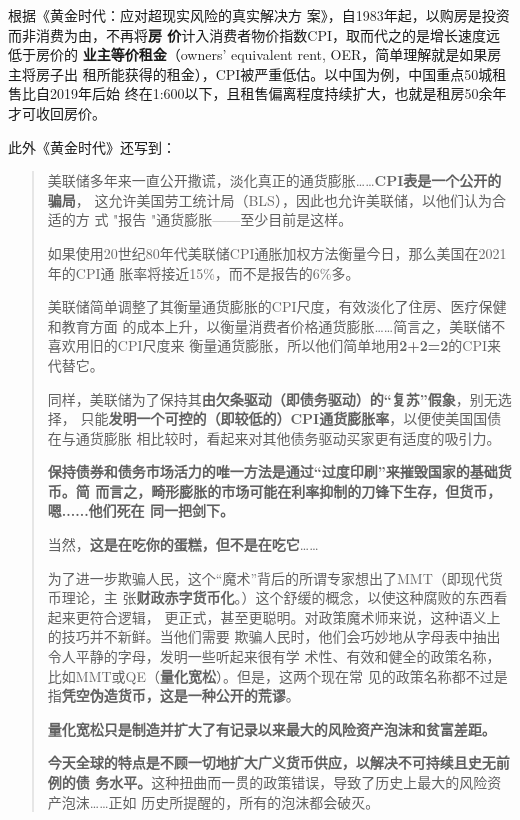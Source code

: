 根据《黄金时代：应对超现实风险的真实解决方
案》\cite{piepenburg2022gold}，自1983年起，以购房是投资而非消费为由，不再将\textbf{房
  价}计入消费者物价指数CPI，取而代之的是增长速度远低于房价的%
\textbf{业主等价租金}（owners’ equivalent rent, OER，简单理解就是如果房主将房子出
租所能获得的租金），CPI被严重低估。以中国为例，中国重点50城租售比自2019年后始
终在1:600以下，且租售偏离程度持续扩大，也就是租房50余年才可收回房价。


此外《黄金时代》还写到：
\begin{quotation}
  美联储多年来一直公开撒谎，淡化真正的通货膨胀……\textbf{CPI表是一个公开的骗局}，
  这允许美国劳工统计局（BLS），因此也允许美联储，以他们认为合适的方
  式 "报告 "通货膨胀——至少目前是这样。

  如果使用20世纪80年代美联储CPI通胀加权方法衡量今日，那么美国在2021年的CPI通
  胀率将接近15\%，而不是报告的6\%多。

  美联储简单调整了其衡量通货膨胀的CPI尺度，有效淡化了住房、医疗保健和教育方面
  的成本上升，以衡量消费者价格通货膨胀……简言之，美联储不喜欢用旧的CPI尺度来
  衡量通货膨胀，所以他们简单地用\textbf{2+2=2}的CPI来代替它。

  同样，美联储为了保持其\textbf{由欠条驱动（即债务驱动）的“复苏”假象}，别无选择，
  只能\textbf{发明一个可控的（即较低的）CPI通货膨胀率}，以便使美国国债在与通货膨胀
  相比较时，看起来对其他债务驱动买家更有适度的吸引力。


  \textbf{保持债券和债务市场活力的唯一方法是通过“过度印刷”来摧毁国家的基础货币。简
  而言之，畸形膨胀的市场可能在利率抑制的刀锋下生存，但货币，嗯......他们死在
  同一把剑下。}

  当然，\textbf{这是在吃你的蛋糕，但不是在吃它}……

  为了进一步欺骗人民，这个“魔术”背后的所谓专家想出了MMT（即现代货币理论，主
  张\textbf{财政赤字货币化}。）这个舒缓的概念，以使这种腐败的东西看起来更符合逻辑，
  更正式，甚至更聪明。对政策魔术师来说，这种语义上的技巧并不新鲜。当他们需要
  欺骗人民时，他们会巧妙地从字母表中抽出令人平静的字母，发明一些听起来很有学
  术性、有效和健全的政策名称，比如MMT或QE（\textbf{量化宽松}）。但是，这两个现在常
  见的政策名称都不过是指\textbf{凭空伪造货币，这是一种公开的荒谬}。

  \textbf{量化宽松只是制造并扩大了有记录以来最大的风险资产泡沫和贫富差距。}

  \textbf{今天全球的特点是不顾一切地扩大广义货币供应，以解决不可持续且史无前例的债
    务水平。}这种扭曲而一贯的政策错误，导致了历史上最大的风险资产泡沫……正如
  历史所提醒的，所有的泡沫都会破灭。



\end{quotation}
